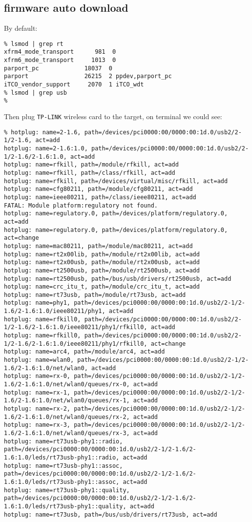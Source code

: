 \documentclass[a4paper]{report}
\begin{document}
\subsection{firmware auto download}
By default:
\begin{lstlisting}
% lsmod | grep rt                                       
xfrm4_mode_transport      981  0 
xfrm6_mode_transport     1013  0 
parport_pc             18037  0 
parport                26215  2 ppdev,parport_pc
iTCO_vendor_support     2070  1 iTCO_wdt
% lsmod | grep usb  
%
\end{lstlisting}
Then plug {\tt TP-LINK} wireless card to the target, on terminal we could see:
\begin{lstlisting}
% hotplug: name=2-1.6, path=/devices/pci0000:00/0000:00:1d.0/usb2/2-1/2-1.6, act=add
hotplug: name=2-1.6:1.0, path=/devices/pci0000:00/0000:00:1d.0/usb2/2-1/2-1.6/2-1.6:1.0, act=add
hotplug: name=rfkill, path=/module/rfkill, act=add
hotplug: name=rfkill, path=/class/rfkill, act=add
hotplug: name=rfkill, path=/devices/virtual/misc/rfkill, act=add
hotplug: name=cfg80211, path=/module/cfg80211, act=add
hotplug: name=ieee80211, path=/class/ieee80211, act=add
FATAL: Module platform:regulatory not found.
hotplug: name=regulatory.0, path=/devices/platform/regulatory.0, act=add
hotplug: name=regulatory.0, path=/devices/platform/regulatory.0, act=change
hotplug: name=mac80211, path=/module/mac80211, act=add
hotplug: name=rt2x00lib, path=/module/rt2x00lib, act=add
hotplug: name=rt2x00usb, path=/module/rt2x00usb, act=add
hotplug: name=rt2500usb, path=/module/rt2500usb, act=add
hotplug: name=rt2500usb, path=/bus/usb/drivers/rt2500usb, act=add
hotplug: name=crc_itu_t, path=/module/crc_itu_t, act=add
hotplug: name=rt73usb, path=/module/rt73usb, act=add
hotplug: name=phy1, path=/devices/pci0000:00/0000:00:1d.0/usb2/2-1/2-1.6/2-1.6:1.0/ieee80211/phy1, act=add
hotplug: name=rfkill0, path=/devices/pci0000:00/0000:00:1d.0/usb2/2-1/2-1.6/2-1.6:1.0/ieee80211/phy1/rfkill0, act=add
hotplug: name=rfkill0, path=/devices/pci0000:00/0000:00:1d.0/usb2/2-1/2-1.6/2-1.6:1.0/ieee80211/phy1/rfkill0, act=change
hotplug: name=arc4, path=/module/arc4, act=add
hotplug: name=wlan0, path=/devices/pci0000:00/0000:00:1d.0/usb2/2-1/2-1.6/2-1.6:1.0/net/wlan0, act=add
hotplug: name=rx-0, path=/devices/pci0000:00/0000:00:1d.0/usb2/2-1/2-1.6/2-1.6:1.0/net/wlan0/queues/rx-0, act=add
hotplug: name=rx-1, path=/devices/pci0000:00/0000:00:1d.0/usb2/2-1/2-1.6/2-1.6:1.0/net/wlan0/queues/rx-1, act=add
hotplug: name=rx-2, path=/devices/pci0000:00/0000:00:1d.0/usb2/2-1/2-1.6/2-1.6:1.0/net/wlan0/queues/rx-2, act=add
hotplug: name=rx-3, path=/devices/pci0000:00/0000:00:1d.0/usb2/2-1/2-1.6/2-1.6:1.0/net/wlan0/queues/rx-3, act=add
hotplug: name=rt73usb-phy1::radio, path=/devices/pci0000:00/0000:00:1d.0/usb2/2-1/2-1.6/2-1.6:1.0/leds/rt73usb-phy1::radio, act=add
hotplug: name=rt73usb-phy1::assoc, path=/devices/pci0000:00/0000:00:1d.0/usb2/2-1/2-1.6/2-1.6:1.0/leds/rt73usb-phy1::assoc, act=add
hotplug: name=rt73usb-phy1::quality, path=/devices/pci0000:00/0000:00:1d.0/usb2/2-1/2-1.6/2-1.6:1.0/leds/rt73usb-phy1::quality, act=add
hotplug: name=rt73usb, path=/bus/usb/drivers/rt73usb, act=add
\end{lstlisting}
\end{document}
